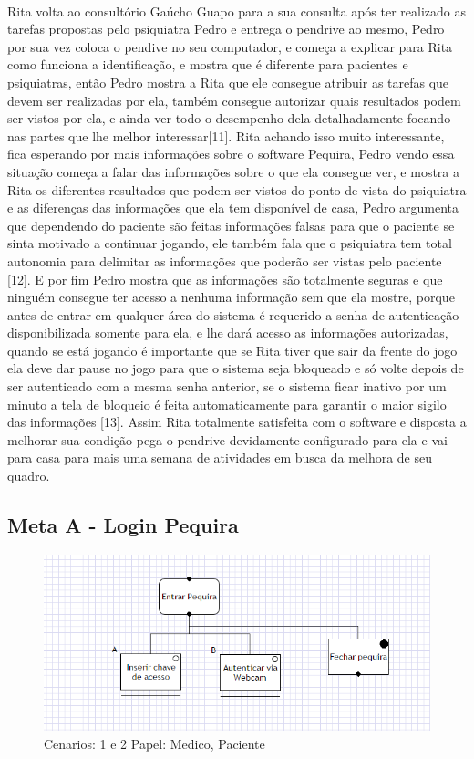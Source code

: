 \documentclass[12pt]{article}
\begin{document}
\paragraph{} Rita volta ao consultório Gaúcho Guapo para a sua consulta após ter realizado as tarefas propostas pelo psiquiatra Pedro e entrega o pendrive ao mesmo, Pedro por sua vez coloca o pendive no seu computador, e começa a explicar para Rita como funciona a identificação, e mostra que é diferente para pacientes e psiquiatras, então Pedro mostra a Rita que ele consegue atribuir as tarefas que devem ser realizadas por ela, também consegue autorizar quais resultados podem ser vistos por ela, e ainda ver todo o desempenho dela detalhadamente focando nas partes que lhe melhor interessar[11]. Rita achando isso muito interessante, fica esperando por mais informações sobre o software Pequira, Pedro vendo essa situação começa a falar das informações sobre o que ela consegue ver, e mostra a Rita os diferentes resultados que podem ser vistos do ponto de vista do psiquiatra e as diferenças das informações que ela tem disponível de casa, Pedro argumenta que dependendo do paciente são feitas informações falsas para que o paciente se sinta motivado a continuar jogando, ele também fala que o psiquiatra tem total autonomia para delimitar as informações que poderão ser vistas pelo paciente [12]. E por fim Pedro mostra que as informações são totalmente seguras e que ninguém consegue ter acesso a nenhuma informação sem que ela mostre, porque antes de entrar em qualquer área do sistema é requerido a senha de autenticação disponibilizada somente para ela, e lhe dará acesso as informações autorizadas, quando se está jogando é importante que se Rita tiver que sair da frente do jogo ela deve dar pause no jogo para que o sistema seja bloqueado e só volte depois de ser autenticado com a mesma senha anterior, se o sistema ficar inativo por um minuto a tela de bloqueio é feita automaticamente para garantir o maior sigilo das informações [13]. Assim Rita totalmente satisfeita com o software e disposta a melhorar sua condição pega o pendrive devidamente configurado para ela e vai para casa para mais uma semana de atividades em busca da melhora de seu quadro.   

\newpage
\subsection{Meta A - Login Pequira}

\begin{figure}[h]
\centering
\includegraphics[scale=0.7]{MetaB.png}
\caption{Cenarios: 1 e 2 \quad Papel: Medico, Paciente}
\end{figure}
\end{document}
